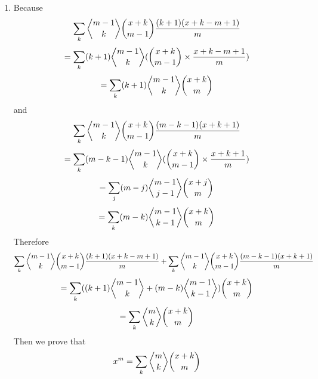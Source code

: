 \documentclass[12pt,a4paper]{article}
\makeatletter
\newtheorem*{solution}{Solution}
\theoremstyle{definition}
\def\bangle{ \atopwithdelims \langle \rangle}
\renewenvironment{solution}[1][Solution] {\par\pushQED{\qed}\normalfont\topsep6\p@\@plus6\p@\relax\trivlist\item[\hskip\labelsep\bfseries#1\@addpunct{.}]\ignorespaces}{\popQED\endtrivlist\@endpefalse} \makeatother
\makeatother
\begin{document}
\begin{enumerate}
\begin{solution}
\begin{itemize}
        	        Because 
        	        \begin{equation*}
        	            \sum_k {m-1 \bangle k}\binom{x+k}{m-1}\frac{(k+1)(x+k-m+1)}{m}
        	        \end{equation*}
        	        \begin{equation*}
        	            =\sum_{k} (k+1){m-1 \bangle k}(\binom{x+k}{m-1}\times\frac{x+k-m+1}{m})
        	        \end{equation*}
        	        \begin{equation*}
        	            =\sum_{k} (k+1){m-1 \bangle k}\binom{x+k}{m}
        	        \end{equation*}
        	        and
        	        \begin{equation*}
        	            \sum_k {m-1 \bangle k}\binom{x+k}{m-1}\frac{(m-k-1)(x+k+1)}{m}
        	        \end{equation*}
        	        \begin{equation*}
        	            =\sum_k (m-k-1) {m-1 \bangle k}(\binom{x+k}{m-1}\times\frac{x+k+1}{m})
        	        \end{equation*}
        	        \begin{equation*}
        	            =\sum_{j} (m-j){m-1 \bangle j-1}\binom{x+j}{m}
        	        \end{equation*}
        	        \begin{equation*}
        	            =\sum_k (m-k){m-1 \bangle k-1}\binom{x+k}{m}
        	        \end{equation*}
        	        Therefore
        	        \begin{equation*}
        	            \sum_{k} {m-1 \bangle k}\binom{x+k}{m-1}\frac{(k+1)(x+k-m+1)}{m}+\sum_{k}{m-1 \bangle k}\binom{x+k}{m-1}\frac{(m-k-1)(x+k+1)}{m}
        	        \end{equation*}
        	        \begin{equation*}
        	            =\sum_k ((k+1){m-1 \bangle k}+(m-k){m-1 \bangle k-1})\binom{x+k}{m}
        	        \end{equation*}
        	        \begin{equation*}
        	            =\sum_k {m \bangle k}\binom{x+k}{m}
        	        \end{equation*}
        	        Then we prove that
        	        \begin{equation*}
        	            x^m=\sum_k{m \bangle k}\binom{x+k}{m}
        	        \end{equation*}

\end{itemize}
\end{solution}
\end{enumerate}
\end{document}
